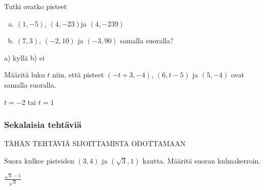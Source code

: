 \begin{tehtavasivu}
\begin{tehtava}
Tutki ovatko pisteet  
\begin{enumerate}[a)]
\item $(1,-5)$, $(4,-23)$ja $(4,-239)$
\item $(7,3)$, $(-2,10)$ ja $(-3,90)$ samalla suoralla?
\end{enumerate}
\begin{vastaus}
a) kyllä b) ei
\end{vastaus}
\end{tehtava}

\begin{tehtava}
Määritä luku $t$ niin, että pisteet $(-t+3,-4)$, $(6,t-5)$ ja $(5,-4)$ ovat samalla suoralla.
\begin{vastaus}
$t=-2$ tai $t=1$
\end{vastaus}
\end{tehtava}

\subsubsection*{Sekalaisia tehtäviä}

TÄHÄN TEHTÄVIÄ SIJOITTAMISTA ODOTTAMAAN

\begin {tehtava}
Suora kulkee pisteiden $(3,4)$ ja $(\sqrt{3},1)$ kautta. Määritä suoran kulmakerroin.
\begin {vastaus}
$\frac{\sqrt{3}-1}{\sqrt{3}}$
\end {vastaus}
\end {tehtava}

\end{tehtavasivu}
